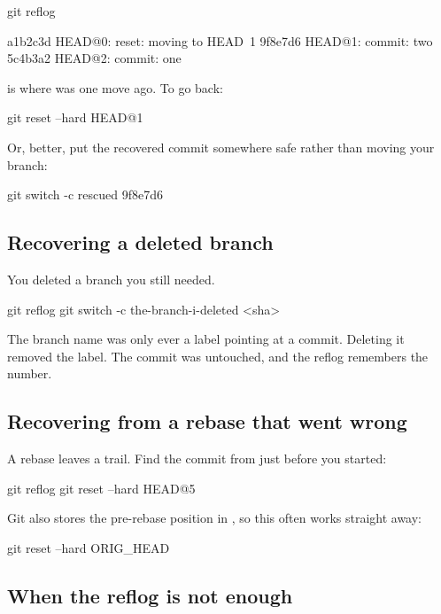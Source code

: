 \documentclass[11pt]{article}
\begin{document}
\begin{shell}
git reflog
\end{shell}

\begin{terminal}
a1b2c3d HEAD@{0}: reset: moving to HEAD~1
9f8e7d6 HEAD@{1}: commit: two
5c4b3a2 HEAD@{2}: commit: one
\end{terminal}

 is where  was one move ago. To go back:

\begin{shell}
git reset --hard HEAD@{1}
\end{shell}

Or, better, put the recovered commit somewhere safe rather than moving your branch:

\begin{shell}
git switch -c rescued 9f8e7d6
\end{shell}

\subsection{Recovering a deleted branch}

You deleted a branch you still needed.

\begin{shell}
git reflog
git switch -c the-branch-i-deleted <sha>
\end{shell}

The branch name was only ever a label pointing at a commit. Deleting it removed the
label. The commit was untouched, and the reflog remembers the number.

\subsection{Recovering from a rebase that went wrong}

A rebase leaves a trail. Find the commit from just before you started:

\begin{shell}
git reflog
git reset --hard HEAD@{5}
\end{shell}

Git also stores the pre-rebase position in , so this often works
straight away:

\begin{shell}
git reset --hard ORIG_HEAD
\end{shell}

\subsection{When the reflog is not enough}
\end{document}
